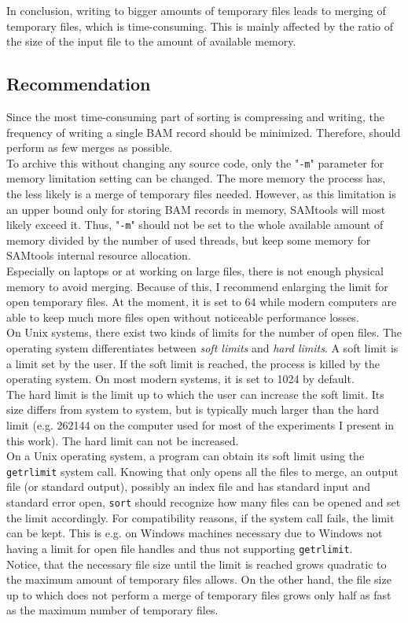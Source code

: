 In conclusion, writing to bigger amounts of temporary files leads to merging of temporary files, which is time-consuming. This is mainly affected by the ratio of the size of the input file to the amount of available memory.

\subsection{Recommendation}

Since the most time-consuming part of sorting is compressing and writing, the frequency of writing a single BAM record should be minimized. Therefore, \sort should perform as few merges as possible. \\
To archive this without changing any source code, only the "\texttt{-m}" parameter for memory limitation setting can be changed. The more memory the process has, the less likely is a merge of temporary files needed. However, as this limitation is an upper bound only for storing BAM records in memory, SAMtools will most likely exceed it. Thus, "\texttt{-m}" should not be set to the whole available amount of memory divided by the number of used threads, but keep some memory for SAMtools internal resource allocation. \\
Especially on laptops or at working on large files, there is not enough physical memory to avoid merging. Because of this, I recommend enlarging the limit for open temporary files. At the moment, it is set to 64 while modern computers are able to keep much more files open without noticeable performance losses. \\
On Unix systems, there exist two kinds of limits for the number of open files. The operating system differentiates between \textit{soft limits} and \textit{hard limits}.
A soft limit is a limit set by the user. If the soft limit is reached, the process is killed by the operating system. On most modern systems, it is set to 1024 by default. \\
The hard limit is the limit up to which the user can increase the soft limit. Its size differs from system to system, but is typically much larger than the hard limit (e.g. 262144 on the computer used for most of the experiments I present in this work). The hard limit can not be increased. \\
On a Unix operating system, a program can obtain its soft limit using the \texttt{getrlimit} \cite{noauthor_getrlimit2_nodate} system call. Knowing that \sort only opens all the files to merge, an output file (or standard output), possibly an index file and has standard input and standard error open, \texttt{sort} should recognize how many files can be opened and set the limit accordingly. For compatibility reasons, if the system call fails, the limit can be kept.
This is e.g. on Windows machines necessary due to Windows not having a limit for open file handles and thus not supporting \texttt{getrlimit}. \\
Notice, that the necessary file size until the limit is reached grows quadratic to the maximum amount of temporary files \sort allows. On the other hand, the file size up to which \sort does not perform a merge of temporary files grows only half as fast as the maximum number of temporary files.

